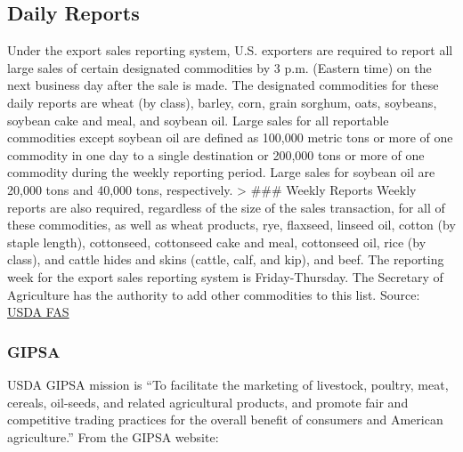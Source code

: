 \documentclass[
]{book}
\begin{document}
\hypertarget{daily-reports}{%
\subsection{Daily Reports}\label{daily-reports}}

Under the export sales reporting system, U.S. exporters are required to
report all large sales of certain designated commodities by 3 p.m.
(Eastern time) on the next business day after the sale is made. The
designated commodities for these daily reports are wheat (by class),
barley, corn, grain sorghum, oats, soybeans, soybean cake and meal, and
soybean oil. Large sales for all reportable commodities except soybean
oil are defined as 100,000 metric tons or more of one commodity in one
day to a single destination or 200,000 tons or more of one commodity
during the weekly reporting period. Large sales for soybean oil are
20,000 tons and 40,000 tons, respectively. \textgreater{} \#\#\# Weekly Reports
Weekly reports are also required, regardless of the size of the sales
transaction, for all of these commodities, as well as wheat products,
rye, flaxseed, linseed oil, cotton (by staple length), cottonseed,
cottonseed cake and meal, cottonseed oil, rice (by class), and cattle
hides and skins (cattle, calf, and kip), and beef. The reporting week
for the export sales reporting system is Friday-Thursday. The Secretary
of Agriculture has the authority to add other commodities to this list.
Source: \href{http://apps.fas.usda.gov/export-sales/backgrnd.htm\#Daily\%20Reports}{USDA
FAS}

\hypertarget{gipsa}{%
\subsubsection{GIPSA}\label{gipsa}}

USDA GIPSA mission is ``To facilitate the marketing of livestock,
poultry, meat, cereals, oil-seeds, and related agricultural products,
and promote fair and competitive trading practices for the overall
benefit of consumers and American agriculture.'' From the GIPSA website:
\end{document}
